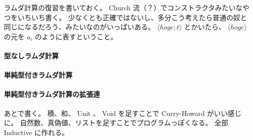 ラムダ計算の復習を書いておく。
Church 流（？）でコンストラクタみたいなやつをいちいち書く。
少なくとも正確ではないし、多分こう考えたら普通の奴と同じになるだろう、みたいなのがいっぱいある。
\(\langle hoge ; t \rangle\) とかいたら、 \(\langle hoge \rangle\) の元を \(a_i\) のように表すということ。

\paragraph*{型なしラムダ計算}

\newpage

\paragraph*{単純型付きラムダ計算}

\newpage

\paragraph*{単純型付きラムダ計算の拡張達}
あとで書く。
積、和、 Unit 、 Void を足すことで Curry-Howard がいい感じに。
自然数、真偽値、リストを足すことでプログラムっぽくなる。
全部 Inductive に作れる。
%